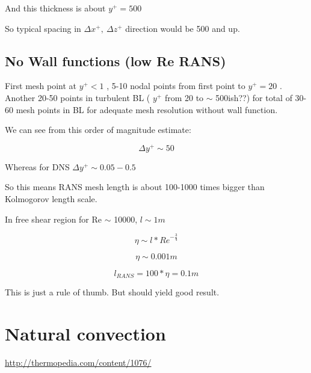 \documentclass[12pt]{article}
\renewcommand{\_}{\kern-1.5pt\textunderscore\kern-1.5pt}
\begin{document}
\begin{itemize}
And this thickness is about  \( y^{+}=500 \) \par

So typical spacing in  \(  \Delta x^{+},~ \Delta z^{+} \)  direction would be 500 and up.\par

\par

\subsection{No Wall functions (low Re RANS)}\par

First mesh point at  \( y^{+}<1 \) , 5-10 nodal points from first point to  \( y^{+}=20 \) . Another 20-50 points in turbulent BL ( \( y^{+} \)  from 20 to $ \sim $ 500ish??) for total of 30-60 mesh points in BL for adequate mesh resolution without wall function.\par


\vspace{\baselineskip}
We can see from this order of magnitude estimate:\par

 \[  \Delta y^{+} \sim 50 \] \par

Whereas for DNS  \(  \Delta y^{+} \sim 0.05-0.5 \) \par

So this means RANS mesh length is about 100-1000 times bigger than Kolmogorov length scale.\par

In free shear region for Re $ \sim $  10000,  \( l \sim 1m \) \par

 \[  \eta  \sim l\ast{Re}^{-\frac{3}{4}} \] 

 \[  \eta  \sim 0.001m \] 

 \[ l_{RANS}=100\ast \eta =0.1 m \] 

This is just a rule of thumb. But should yield good result.\par

\section{Natural convection}\par

\href{http://thermopedia.com/content/1076/}{http://thermopedia.com/content/1076/}\par


\end{itemize}
\end{document}
